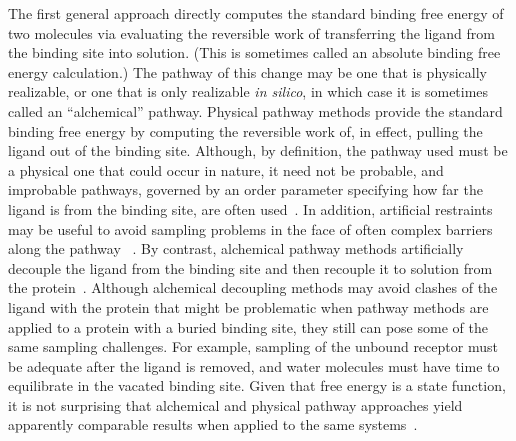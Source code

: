 \documentclass[aps,pre,twocolumn,nofootinbib,superscriptaddress,10pt, final,tightenlines]{revtex4-1}
\begin{document}
The first general approach directly computes the standard binding free energy of two molecules via evaluating the reversible work of transferring the ligand from the binding site into solution. 
(This is sometimes called an absolute binding free energy calculation.) 
The pathway of this change may be one that is physically realizable, or one that is only realizable {\em in silico}, in which case it is sometimes called an ``alchemical'' pathway. 
Physical pathway methods provide the standard binding free energy by computing the reversible work of, in effect, pulling the ligand out of the binding site. 
Although, by definition, the pathway used must be a physical one that could occur in nature, it need not be probable, and improbable pathways, governed by an order parameter specifying how far the ligand is from the binding site, are often used~\cite{woo_calculation_2005, ytreberg_absolute_2009, velez-vega_overcoming_2013, henriksen_computational_2015, hsiao_prediction_2014, bhakat_resolving_2016}.  
In addition, artificial restraints may be useful to avoid sampling problems in the face of often complex barriers along the pathway ~\cite{woo_calculation_2005, velez-vega_overcoming_2013, henriksen_computational_2015, hsiao_prediction_2014, bhakat_resolving_2016}. 
By contrast, alchemical pathway methods artificially decouple the ligand from the binding site and then recouple it to solution from the protein~\cite{jorgensen_efficient_1988, Hermans:1986:Isr.J.Chem., gilson_statistical-thermodynamic_1997, boresch_absolute_2003, mobley_use_2006}.
Although alchemical decoupling methods may avoid clashes of the ligand with the protein that might be problematic when pathway methods are applied to a protein with a buried binding site, they still can pose some of the same sampling challenges.
For example, sampling of the unbound receptor must be adequate after the ligand is removed, and water molecules must have time to equilibrate in the vacated binding site.
Given that free energy is a state function, it is not surprising that alchemical and physical pathway approaches yield apparently comparable results when applied to the same systems~\cite{lee_calculation_2006, gumbart_standard_2013, de_ruiter_proteinligand_2013, yin_overview_2016}.  
\end{document}
